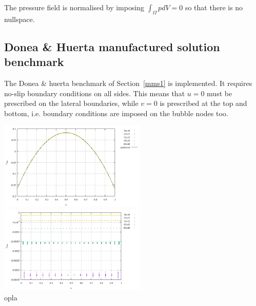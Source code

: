 The pressure field is normalised by imposing $\int_\Omega p dV=0 $ so that there is no nullspace.

\subsection*{Donea \& Huerta manufactured solution benchmark}

The Donea \& huerta benchmark of Section~\ref{mms1} is implemented. It requires 
no-slip boundary conditions on all sides. This means that $u=0$ must be 
prescribed on the lateral boundaries, while $v=0$ is prescribed at the top and bottom, 
i.e. boundary conditions are imposed on the bubble nodes too.

\begin{center}
\includegraphics[width=7cm]{python_codes/fieldstone_80/results/dh/pressure}
\includegraphics[width=7cm]{python_codes/fieldstone_80/results/dh/pressure_error}\\
{\captionfont  opla}
\end{center}


